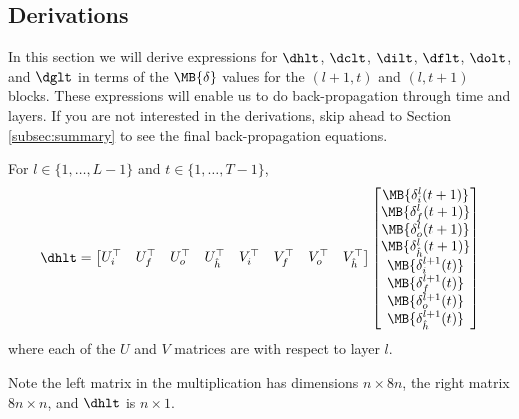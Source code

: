 \subsection{Derivations}
In this section we will derive expressions for $\dhlt$, $\dclt$, $\dilt$, $\dflt$, $\dolt$, and $\dglt$ in terms of the $\MB{\delta}$ values for the $(l+1,t)$ and $(l,t+1)$ blocks. 
These expressions will enable us to do back-propagation through time and layers.
If you are not interested in the derivations, skip ahead to Section \ref{subsec:summary} to see the final back-propagation equations.
\begin{lemma}
For $l \in \{1,\dots, L-1\}$ and $t \in \{1, \dots, T-1\}$,
\begin{equation}
\dhlt = 
\begin{bmatrix}
U_i^\top & U_f^\top & U_o^\top & U_{\hat{h}}^\top & V_i^\top & V_f^\top & V_o^\top & V_{\hat{h}}^\top 
\end{bmatrix}
\begin{bmatrix}
\MB{\delta_i^l(t+1)} \\
\MB{\delta_f^l(t+1)} \\
\MB{\delta_o^l(t+1)} \\
\MB{\delta_{\hat{h}}^l(t+1)} \\
\MB{\delta_i^{l+1}(t)} \\
\MB{\delta_f^{l+1}(t)} \\
\MB{\delta_o^{l+1}(t)} \\
\MB{\delta_{\hat{h}}^{l+1}(t)} 
\end{bmatrix}
\end{equation}
where each of the $U$ and $V$ matrices are with respect to layer $l$.
\end{lemma}
Note the left matrix in the multiplication has dimensions $n \times 8n$, the right matrix $8n \times n$, and $\dhlt$ is $n \times 1$.
